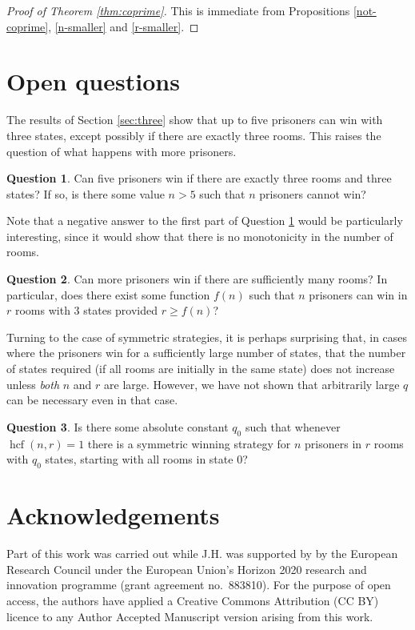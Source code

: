 \documentclass[a4paper,11pt]{extarticle}
\theoremstyle{definition}
\newtheorem{question}{Question}
\theoremstyle{remark}
\newcommand{\hcf}{\operatorname{hcf}}
\begin{document}
	\begin{proof}[Proof of Theorem \ref{thm:coprime}]
		This is immediate from Propositions \ref{not-coprime}, \ref{n-smaller} and \ref{r-smaller}.
	\end{proof}
	
	\section{Open questions}
	The results of Section \ref{sec:three} show that up to five prisoners can win with three states, except possibly if there are exactly three rooms. 
	This raises the question of what happens with more prisoners.
	\begin{question}\label{five-three}Can five prisoners win if there are exactly three rooms and three states? If so, is there some value $n>5$ such that $n$ prisoners cannot win?
	\end{question}
	Note that a negative answer to the first part of Question \ref{five-three} would be particularly interesting, since it would show that there is no monotonicity in the number of rooms.
	\begin{question}Can more prisoners win if there are sufficiently many rooms? In particular, does there exist some function $f(n)$ such that $n$ prisoners can win in $r$ rooms with $3$ states provided $r\geq f(n)$?
	\end{question}
	Turning to the case of symmetric strategies, it is perhaps surprising that, in cases where the prisoners win for a sufficiently large number of states, that the number of states required (if all rooms are initially in the same state) does not increase unless \textit{both} $n$ and $r$ are large. However, we have not shown that arbitrarily large $q$ can be necessary even in that case.
	\begin{question}
		Is there some absolute constant $q_0$ such that whenever $\hcf(n,r)=1$ there is a symmetric winning strategy for $n$ prisoners in $r$ rooms with $q_0$ states, starting with all rooms in state $0$?
	\end{question}
	
	\section*{Acknowledgements}
	Part of this work was carried out while J.H. was supported by by the European Research Council under the European Union’s Horizon 2020 research and innovation programme (grant agreement no.\ 883810). For the purpose of open access, the authors have applied a Creative Commons Attribution (CC BY) licence to any Author Accepted Manuscript version arising from this work.
	
\end{document}
